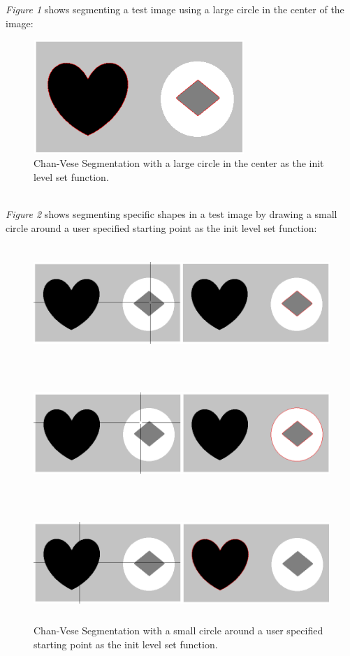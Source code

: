 \documentclass[a4paper,11pt]{article}
\begin{document}
\newpage

\emph{Figure 1} shows segmenting a test image using a large circle in the center of the image:

\begin{figure}[!htb]
  \centering
  \includegraphics[width=8cm, height=4.3cm]{1.png}
  \caption{\small Chan-Vese Segmentation with a large circle in the center as the init level set function.}
\end{figure}

 \\
\emph{Figure 2} shows segmenting specific shapes in a test image by drawing a small circle around a user specified starting point as the init level set function:

\begin{figure}[!htb]
  \centering
  \includegraphics[width=16cm, height=4.42cm]{2.png}
\end{figure}

\begin{figure}[!htb]
  \centering
  \includegraphics[width=16cm, height=4.42cm]{3.png}
\end{figure}

\begin{figure}[!htb]
  \centering
  \includegraphics[width=16cm, height=4.42cm]{4.png}
  \caption{\small Chan-Vese Segmentation with a small circle around a user specified starting point as the init level set function.}
\end{figure}
\end{document}

